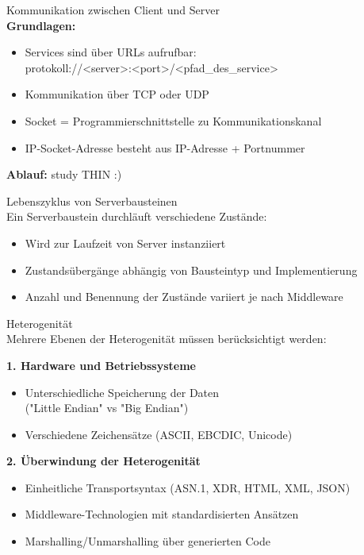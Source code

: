\begin{theorem}{Kommunikation zwischen Client und Server}\\
\textbf{Grundlagen:}
\begin{itemize}
    \item Services sind über URLs aufrufbar: \\protokoll://<server>:<port>/<pfad\_des\_service>
    \item Kommunikation über TCP oder UDP
    \item Socket = Programmierschnittstelle zu Kommunikationskanal
    \item IP-Socket-Adresse besteht aus IP-Adresse + Portnummer
\end{itemize}

\textbf{Ablauf:} study THIN :)
\end{theorem}

\begin{corollary}{Lebenszyklus von Serverbausteinen}\\
Ein Serverbaustein durchläuft verschiedene Zustände:
\begin{itemize}
    \item Wird zur Laufzeit von Server instanziiert
    \item Zustandsübergänge abhängig von Bausteintyp und Implementierung
    \item Anzahl und Benennung der Zustände variiert je nach Middleware
\end{itemize}
\end{corollary}

\begin{corollary}{Heterogenität}\\
Mehrere Ebenen der Heterogenität müssen berücksichtigt werden:

\textbf{1. Hardware und Betriebssysteme}
\begin{itemize}
    \item Unterschiedliche Speicherung der Daten\\ ("Little Endian" vs "Big Endian")
    \item Verschiedene Zeichensätze (ASCII, EBCDIC, Unicode)
\end{itemize}

\textbf{2. Überwindung der Heterogenität}
\begin{itemize}
    \item Einheitliche Transportsyntax (ASN.1, XDR, HTML, XML, JSON)
    \item Middleware-Technologien mit standardisierten Ansätzen
    \item Marshalling/Unmarshalling über generierten Code
\end{itemize}
\end{corollary}

